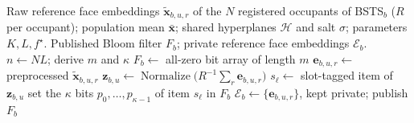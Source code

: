 \documentclass[pdflatex,sn-mathphys-num]{sn-jnl}%
\theoremstyle{thmstyleone}%
\theoremstyle{thmstyletwo}%
\theoremstyle{thmstylethree}%
\begin{document}
\begin{algorithm}[!t]
\small
\caption{Building the published Bloom filter at BSTS$_b$}
\label{alg:build}
\begin{algorithmic}[1]
\Require Raw reference face embeddings $\tilde{\mathbf{x}}_{b,u,r}$ of the $N$ registered occupants of BSTS$_b$ ($R$ per occupant);
\Statex population mean $\bar{\mathbf{x}}$; shared hyperplanes $\mathcal{H}$ and salt $\sigma$; parameters $K,L,f^\star$.
\Ensure Published Bloom filter $F_b$; private reference face embeddings $\mathcal{E}_b$.
\State $n\gets NL$; derive $m$ and $\kappa$ 
\State $F_b\gets$ all-zero bit array of length $m$
    \State $\mathbf{e}_{b,u,r}\gets$ preprocessed $\tilde{\mathbf{x}}_{b,u,r}$ 
  \EndFor
  \State $\mathbf{z}_{b,u}\gets\operatorname{Normalize}\bigl(R^{-1}\sum_{r}\mathbf{e}_{b,u,r}\bigr)$ 
    \State $s_\ell\gets$ slot-tagged item of $\mathbf{z}_{b,u}$ 
    \State set the $\kappa$ bits $p_0,\dots,p_{\kappa-1}$ of item $s_\ell$ in $F_b$ 
  \EndFor
\EndFor
\State $\mathcal{E}_b\gets\{\mathbf{e}_{b,u,r}\}$, kept private; publish $F_b$
\end{algorithmic}
\end{algorithm}
\end{document}
